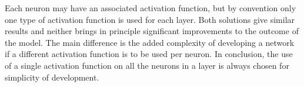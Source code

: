 Each neuron may have an associated activation function, but by convention only one type of activation function is used for each layer. Both solutions give similar results and neither brings in principle significant improvements to the outcome of the model. The main difference is the added complexity of developing a network if a different activation function is to be used per neuron. In conclusion, the use of a single activation function on all the neurons in a layer is always chosen for simplicity of development.
\newline